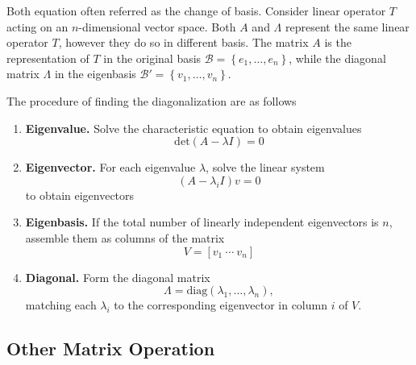 \documentclass[../../../main.tex]{subfiles}
\begin{document}
Both equation often referred as the change of basis.
Consider linear operator $T$ acting on an $n$-dimensional vector space.
Both $A$ and $\Lambda$ represent the same linear operator $T$, however they do so in different basis.
The matrix $A$ is the representation of $T$ in the original basis $\mathcal{B}=\left\{ e_1,\dots,e_n \right\} $, while the diagonal matrix $\Lambda$ in the eigenbasis $\mathcal{B}'=\left\{v_1,\dots,v_n \right\} $.

The procedure of finding the diagonalization are as follows
\begin{enumerate}
	\item \textbf{Eigenvalue.} Solve the characteristic equation to obtain eigenvalues
	      \begin{equation*}
		      \mathrm{det}(A - \lambda I) = 0
	      \end{equation*}
	\item \textbf{Eigenvector.} For each eigenvalue $\lambda$, solve the linear system
	      \begin{equation*}
		      (A-\lambda_{i} I)v=0
	      \end{equation*}
	      to obtain eigenvectors
	\item \textbf{Eigenbasis.} If the total number of linearly independent eigenvectors is $n$, assemble them as columns of the matrix
	      \begin{equation*}
		      V = [v_{1}\ \cdots\ v_{n}]
	      \end{equation*}
	\item \textbf{Diagonal.} Form the diagonal matrix
	      \begin{equation*}
		      \Lambda = \mathrm{diag}(\lambda_{1},\ldots,\lambda_{n}),
	      \end{equation*}
	      matching each $\lambda_i$ to the corresponding eigenvector in column $i$ of $V$.
\end{enumerate}


\subsection{Other Matrix Operation}
\end{document}
